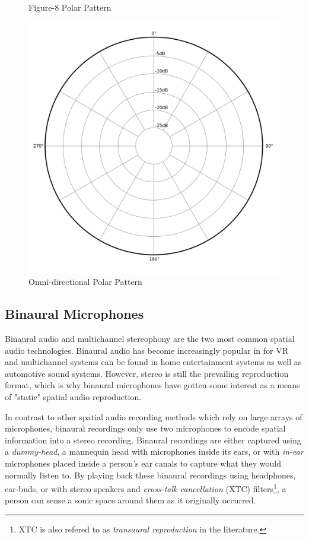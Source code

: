 \begin{figure}[!htb]
  \caption{Figure-8 Polar Pattern}\label{fig:fig-8}
\endminipage\hfill
{}%
  \includegraphics[width=\linewidth]{img/omni.png}
  \caption{Omni-directional Polar Pattern}\label{fig:omni}
\endminipage
\end{figure}




\subsection{Binaural Microphones}

Binaural audio and multichannel stereophony are the two most common spatial audio technologies. Binaural audio has become increasingly popular in for VR and multichannel systems can be found in home entertainment systems as well as automotive sound systems. However, stereo is still the prevailing reproduction format, which is why binaural microphones have gotten some interest as a means of "static" spatial audio reproduction.  

In contrast to other spatial audio recording methods which rely on large arrays of microphones, binaural recordings only use two microphones to encode spatial information into a stereo recording. Binaural recordings are either captured using a \textit{dummy-head}, a mannequin head with microphones inside its ears, or with \textit{in-ear} microphones placed inside a person's ear canals to capture what they would normally listen to. By playing back these binaural recordings using headphones, ear-buds, or with stereo speakers and \textit{cross-talk cancellation} (XTC) filters\footnote{XTC is also refered to as \textit{transaural reproduction} in the literature.}, a person can sense a sonic space around them as it originally occurred. 

